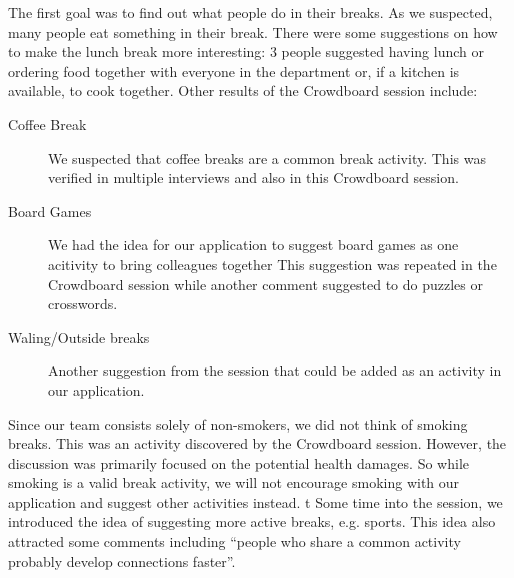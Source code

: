 The first goal was to find out what people do in their breaks. As we suspected, many people eat something in their break. There were some suggestions on how to make the lunch break more interesting: 3 people suggested having lunch or ordering food together with everyone in the department or, if a kitchen is available, to cook together. Other results of the Crowdboard session include: 
\begin{description}
  \item[Coffee Break] We suspected that coffee breaks are a common break activity. This was verified in multiple interviews and also in this Crowdboard session.
  \item[Board Games] We had the idea for our application to suggest board games as one acitivity to bring colleagues together This suggestion was repeated in the Crowdboard session while another comment suggested to do puzzles or crosswords.
  \item[Waling/Outside breaks] Another suggestion from the session that could be added as an activity in our application.
\end{description}

Since our team consists solely of non-smokers, we did not think of smoking breaks. This was an activity discovered by the Crowdboard session. However, the discussion was primarily focused on the potential health damages. So while smoking is a valid break activity, we will not encourage smoking with our application and suggest other activities instead.
t
Some time into the session, we introduced the idea of suggesting more active breaks, e.g. sports. This idea also attracted some comments including ``people who share a common activity probably develop
connections faster''.


